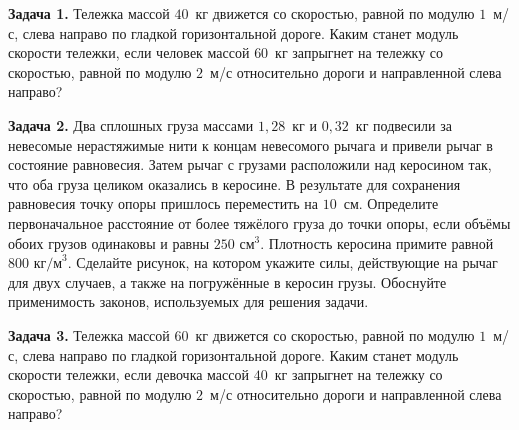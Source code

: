 
\begin{taskbasic}[code={\label{task:mechanics_v5_n22}}]
\textbf{Задача 1.} Тележка массой $40$~кг движется со скоростью, равной по модулю $1$~м/с, слева направо по гладкой горизонтальной дороге. Каким станет модуль скорости тележки, если человек массой $60$~кг запрыгнет на тележку со скоростью, равной по модулю $2$~м/с относительно дороги и направленной слева направо?

\end{taskbasic}

\begin{taskbasic}[code={\label{task:mechanics_v5_n26}}]
\textbf{Задача 2.} Два сплошных груза массами $1{,}28$~кг и $0{,}32$~кг подвесили за невесомые нерастяжимые нити к концам невесомого рычага и привели рычаг в состояние равновесия. Затем рычаг с грузами расположили над керосином так, что оба груза целиком оказались в керосине. В результате для сохранения равновесия точку опоры пришлось переместить на $10$~см. Определите первоначальное расстояние от более тяжёлого груза до точки опоры, если объёмы обоих грузов одинаковы и равны $250\text{ см}^3$. Плотность керосина примите равной $800\text{ кг/м}^3$. Сделайте рисунок, на котором укажите силы, действующие на рычаг для двух случаев, а также на погружённые в керосин грузы. Обоснуйте применимость законов, используемых для решения задачи.

\end{taskbasic}

\begin{taskbasic}[code={\label{task:mechanics_v6_n22}}]
\textbf{Задача 3.} Тележка массой $60$~кг движется со скоростью, равной по модулю $1$~м/с, слева направо по гладкой горизонтальной дороге. Каким станет модуль скорости тележки, если девочка массой $40$~кг запрыгнет на тележку со скоростью, равной по модулю $2$~м/с относительно дороги и направленной слева направо?

\end{taskbasic}

